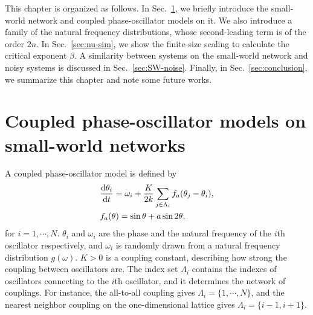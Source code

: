 This chapter is organized as follows.
In Sec.~\ref{sec:model}, we briefly introduce the small-world network and coupled phase-oscillator models on it.
We also introduce a family of the natural frequency distributions, whose second-leading term is of the order $2n$.
In Sec.~\ref{sec:nu-sim}, we show the finite-size scaling
to calculate the critical exponent $\beta$.
A similarity between systems on the small-world network
and noisy systems is discussed in Sec.~\ref{sec:SW-noise}.
Finally, in Sec.~\ref{sec:conclusion}, we summarize this chapter and note some future works.

\section{Coupled phase-oscillator models on small-world networks}
\label{sec:model}

A coupled phase-oscillator model is defined by
\begin{equation}
  \begin{split}
    &\frac{\mathrm{d}\theta_{i}}{\mathrm{d} t}=\omega_{i}+\frac{K}{2k}\sum_{j\in\Lambda_{i}}f_{a}(\theta_{j}-\theta_{i}),\\
    &f_{a}(\theta)=\sin\theta+a\sin2\theta,
    \label{eq:sw-model}
  \end{split}
\end{equation}
for $i=1,\cdots,N$.
$\theta_{i}$ and $\omega_{i}$ are the phase and the natural frequency of the $i$th oscillator respectively,
and $\omega_{i}$ is randomly drawn from a natural frequency distribution $g(\omega)$.
$K>0$ is a coupling constant,
describing how strong the coupling between oscillators are.
The index set $\Lambda_{i}$ contains the indexes of oscillators
connecting to the $i$th oscillator,
and it determines the network of couplings.
For instance, the all-to-all coupling gives $\Lambda_{i}=\{1,\cdots,N\}$,
and the nearest neighbor coupling on the one-dimensional lattice
gives $\Lambda_{i}=\{i-1,i+1\}$.


